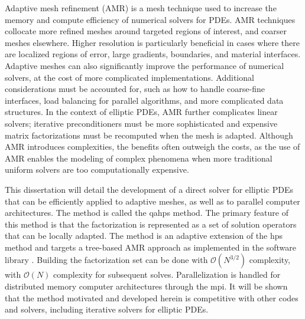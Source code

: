Adaptive mesh refinement (AMR) is a mesh technique used to increase the memory and compute efficiency of numerical solvers for PDEs. AMR techniques collocate more refined meshes around targeted regions of interest, and coarser meshes elsewhere. Higher resolution is particularly beneficial in cases where there are localized regions of error, large gradients, boundaries, and material interfaces. Adaptive meshes can also significantly improve the performance of numerical solvers, at the cost of more complicated implementations. Additional considerations must be accounted for, such as how to handle coarse-fine interfaces, load balancing for parallel algorithms, and more complicated data structures. In the context of elliptic PDEs, AMR further complicates linear solvers; iterative preconditioners must be more sophisticated and expensive matrix factorizations must be recomputed when the mesh is adapted. Although AMR introduces complexities, the benefits often outweigh the costs, as the use of AMR enables the modeling of complex phenomena when more traditional uniform solvers are too computationally expensive.

This dissertation will detail the development of a direct solver for elliptic PDEs that can be efficiently applied to adaptive meshes, as well as to parallel computer architectures. The method is called the \gls{qahps} method. The primary feature of this method is that the factorization is represented as a set of solution operators that can be locally adapted. The method is an adaptive extension of the \gls{hps} method \citep{gillman2014direct} and targets a tree-based AMR approach as implemented in the \pforest software library \citep{burstedde2011p4est}. Building the factorization set can be done with $\mathcal{O}(N^{3/2})$ complexity, with $\mathcal{O}(N)$ complexity for subsequent solves. Parallelization is handled for distributed memory computer architectures through the \gls{mpi}. It will be shown that the method motivated and developed herein is competitive with other codes and solvers, including iterative solvers for elliptic PDEs.